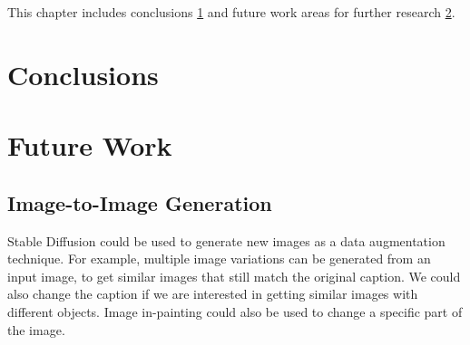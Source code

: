 This chapter includes conclusions \cref{sec:conclusions} and future work areas for further research \cref{sec:future_work}.

\section{Conclusions} \label{sec:conclusions}

\section{Future Work} \label{sec:future_work}

\subsection{Image-to-Image Generation}

Stable Diffusion could be used to generate new images as a data augmentation technique. For example, multiple image variations can be generated from an input image, to get similar images that still match the original caption. We could also change the caption if we are interested in getting similar images with different objects. Image in-painting could also be used to change a specific part of the image.